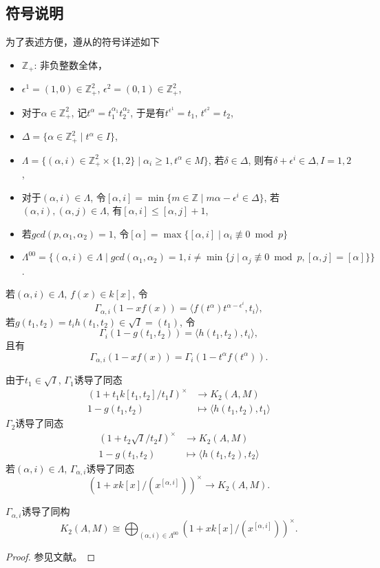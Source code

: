 \subsection{符号说明} %
\label{subsec:符号}
为了表述方便，遵从\cite{MR86f:18017}的符号详述如下\\
\begin{itemize}
	\item $\mathbb{Z}_+$: 非负整数全体， 
	\item $\epsilon^1 = (1,0)\in \mathbb{Z}_+^2$, $\epsilon^2 = (0,1)\in \mathbb{Z}_+^2$,
	\item 对于$\alpha \in \mathbb{Z}_+^2$, 记$t^{\alpha}=t_1^{\alpha_1}t_2^{\alpha_2}$, 于是有$t^{\epsilon^1}=t_1$, $t^{\epsilon^2}=t_2$,
	\item $\Delta=\{\alpha\in\mathbb{Z}_+^2\mid  t^{\alpha}\in I\}$,
	\item $\Lambda=\{(\alpha,i)\in\mathbb{Z}_+^2 \times \{1,2\}\mid  \alpha_i\geq 1, t^{\alpha}\in M\}$, 若$\delta \in \Delta$, 则有$\delta+\epsilon^i \in \Delta, I=1,2$,
	\item 对于$(\alpha,i)\in\Lambda$, 令{\color{blue}$[\alpha,i]=\min\{m\in \mathbb{Z}\mid m\alpha - \epsilon^i\in \Delta\}$}, 
	若$(\alpha,i),(\alpha,j)\in \Lambda$, 有$[\alpha,i]\leq [\alpha,j]+1$,
	\item 若$gcd(p,\alpha_1,\alpha_2)=1$, 令$[\alpha]=\max\{[\alpha,i]\mid  \alpha_i  \not\equiv 0 \bmod p\}$
	\item {\color{blue} $\Lambda^{00}= \big\{(\alpha,i)\in \Lambda\mid  gcd(\alpha_1,\alpha_2)=1, i\neq \min\{j\mid \alpha_j\not\equiv 0 \bmod p, [\alpha,j]=[\alpha]\} \big\}$}.
\end{itemize}
若$(\alpha,i)\in \Lambda$, $f(x)\in k[x]$, 令
\[\Gamma_{\alpha,i}(1-xf(x))= \langle f(t^\alpha)t^{\alpha-\epsilon^i},t_i \rangle,\]
若$g(t_1,t_2)=t_ih(t_1,t_2)\in \sqrt{I}=(t_1)$, 令
\[\Gamma_i(1-g(t_1,t_2))=\langle h(t_1,t_2),t_i \rangle,\]
且有
\[\Gamma_{\alpha,i}(1-xf(x))=\Gamma_i(1-t^{\alpha} f(t^{\alpha})).\]

由于$t_1\in \sqrt{I}$, $\Gamma_1$诱导了同态
\begin{align*}
(1+t_1k[t_1,t_2]/t_1 I)^{\times} &\longrightarrow K_2(A,M)\\
1-g(t_1,t_2) & \mapsto \langle h(t_1,t_2),t_1 \rangle
\end{align*}
$\Gamma_2$诱导了同态
\begin{align*}
(1+t_2\sqrt{I}/t_2 I)^{\times} &\longrightarrow K_2(A,M)\\
1-g(t_1,t_2) & \mapsto \langle h(t_1,t_2),t_2 \rangle
\end{align*}
若$(\alpha,i)\in\Lambda$, $\Gamma_{\alpha,i}$诱导了同态
\[(1+xk[x]/(x^{[\alpha,i]}))^{\times} \longrightarrow K_2(A,M).\]
\begin{theorem}
\label{K2(A,M)}
	$\Gamma_{\alpha,i}$诱导了{\color{red}同构}
\[ K_2(A,M)\cong \bigoplus_{(\alpha,i)\in\Lambda^{00}}(1+xk[x]/(x^{[\alpha,i]}))^{\times}.\]
\end{theorem}
\begin{proof}
	参见文献\cite{MR86f:18017}。
\end{proof}

